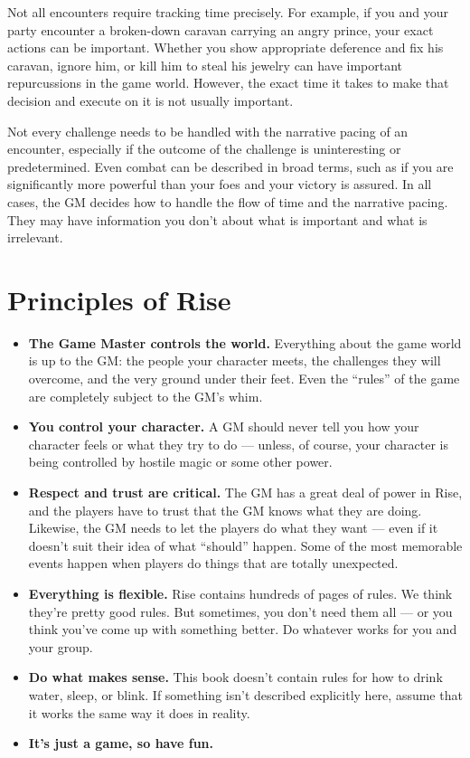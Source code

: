     Not all encounters require tracking time precisely.
    For example, if you and your party encounter a broken-down caravan carrying an angry prince, your exact actions can be important.
    Whether you show appropriate deference and fix his caravan, ignore him, or kill him to steal his jewelry can have important repurcussions in the game world.
    However, the exact time it takes to make that decision and execute on it is not usually important.

    Not every challenge needs to be handled with the narrative pacing of an encounter, especially if the outcome of the challenge is uninteresting or predetermined.
    Even combat can be described in broad terms, such as if you are significantly more powerful than your foes and your victory is assured.
    In all cases, the GM decides how to handle the flow of time and the narrative pacing.
    They may have information you don't about what is important and what is irrelevant.

\section{Principles of Rise}

    \begin{itemize}
        \item \textbf{The Game Master controls the world.} Everything about the game world is up to the GM\@: the people your character meets, the challenges they will overcome, and the very ground under their feet.
            Even the ``rules'' of the game are completely subject to the GM's whim.
        \item \textbf{You control your character.} A GM should never tell you how your character feels or what they try to do --- unless, of course, your character is being controlled by hostile magic or some other power.
        \item \textbf{Respect and trust are critical.} The GM has a great deal of power in Rise, and the players have to trust that the GM knows what they are doing.
            Likewise, the GM needs to let the players do what they want --- even if it doesn't suit their idea of what ``should'' happen.
            Some of the most memorable events happen when players do things that are totally unexpected.
        \item \textbf{Everything is flexible.} Rise contains hundreds of pages of rules.
            We think they're pretty good rules.
            But sometimes, you don't need them all --- or you think you've come up with something better.
            Do whatever works for you and your group.
        \item \textbf{Do what makes sense.} This book doesn't contain rules for how to drink water, sleep, or blink.
            If something isn't described explicitly here, assume that it works the same way it does in reality.
        \item \textbf{It's just a game, so have fun.}
    \end{itemize}

